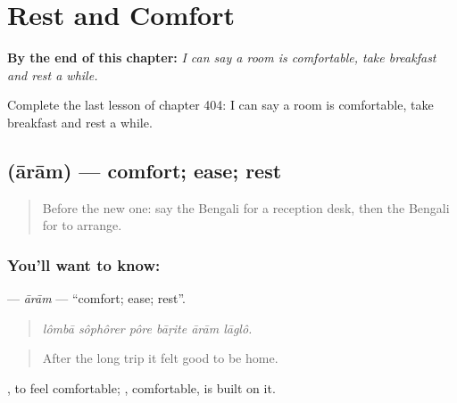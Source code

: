 
\chapter{Rest and Comfort}
\label{ch:bn-rest-and-comfort}

\begin{chapteropening}
\textbf{By the end of this chapter:} \emph{I can say a room is comfortable, take breakfast and rest a while.}

Complete the last lesson of chapter 404: I can say a room is comfortable, take breakfast and rest a while.
\end{chapteropening}

\section[\texorpdfstring{\bn{আরাম} (ārām)}{আরাম (ārām)}]{ (ārām) — comfort; ease; rest}

\label{lesson:BN-C404-aram}



\begin{quote}
Before the new one: say the Bengali for a reception desk, then the Bengali for to arrange.
\end{quote}

\subsection*{You'll want to know: }
\textbf{} — \emph{ārām} — \textquotedblleft{}comfort; ease; rest\textquotedblright{}.

\begin{quote}
     
\end{quote}

\begin{quote}
\emph{lômbā sôphôrer pôre bāṛite ārām lāglô.}
\end{quote}

\begin{quote}
After the long trip it felt good to be home.
\end{quote}

 , to feel comfortable; , comfortable, is built on it.

